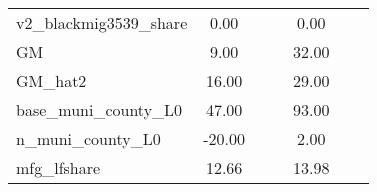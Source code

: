 \begin{table}[htbp]
\begin{tabular}{l*{2}{ccc}}
v2\_blackmig3539\_share&        0.00&            &            &        0.00&            &            \\
GM                  &        9.00&            &            &       32.00&            &            \\
GM\_hat2             &       16.00&            &            &       29.00&            &            \\
base\_muni\_county\_L0 &       47.00&            &            &       93.00&            &            \\
n\_muni\_county\_L0    &      -20.00&            &            &        2.00&            &            \\
mfg\_lfshare         &       12.66&            &            &       13.98&            &            \\
\bottomrule
\end{tabular}
\end{table}
